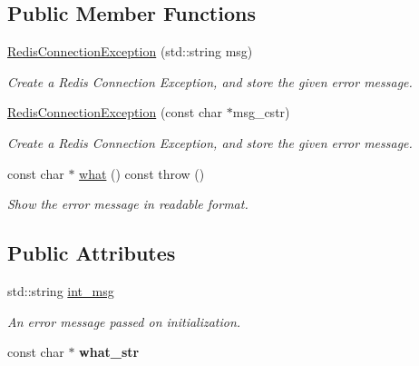 \subsection*{Public Member Functions}
\begin{DoxyCompactItemize}
\item 
\hyperlink{structRedisConnectionException_a1a28a564f37ca6c032222fc57611fe7d}{Redis\+Connection\+Exception} (std\+::string msg)\hypertarget{structRedisConnectionException_a1a28a564f37ca6c032222fc57611fe7d}{}\label{structRedisConnectionException_a1a28a564f37ca6c032222fc57611fe7d}

\begin{DoxyCompactList}\small\item\em Create a Redis Connection Exception, and store the given error message. \end{DoxyCompactList}\item 
\hyperlink{structRedisConnectionException_a5af84b976ba7c84d4891c8b42d0c0b34}{Redis\+Connection\+Exception} (const char $\ast$msg\+\_\+cstr)\hypertarget{structRedisConnectionException_a5af84b976ba7c84d4891c8b42d0c0b34}{}\label{structRedisConnectionException_a5af84b976ba7c84d4891c8b42d0c0b34}

\begin{DoxyCompactList}\small\item\em Create a Redis Connection Exception, and store the given error message. \end{DoxyCompactList}\item 
const char $\ast$ \hyperlink{structRedisConnectionException_a309897cb6e68eea573b2db478543cb16}{what} () const   throw ()\hypertarget{structRedisConnectionException_a309897cb6e68eea573b2db478543cb16}{}\label{structRedisConnectionException_a309897cb6e68eea573b2db478543cb16}

\begin{DoxyCompactList}\small\item\em Show the error message in readable format. \end{DoxyCompactList}\end{DoxyCompactItemize}
\subsection*{Public Attributes}
\begin{DoxyCompactItemize}
\item 
std\+::string \hyperlink{structRedisConnectionException_a95af5cf7df2c6dda75b37574a6cafba4}{int\+\_\+msg}\hypertarget{structRedisConnectionException_a95af5cf7df2c6dda75b37574a6cafba4}{}\label{structRedisConnectionException_a95af5cf7df2c6dda75b37574a6cafba4}

\begin{DoxyCompactList}\small\item\em An error message passed on initialization. \end{DoxyCompactList}\item 
const char $\ast$ {\bfseries what\+\_\+str}\hypertarget{structRedisConnectionException_a03dcbe6a8601ce6b37ab180321bd745b}{}\label{structRedisConnectionException_a03dcbe6a8601ce6b37ab180321bd745b}

\end{DoxyCompactItemize}


